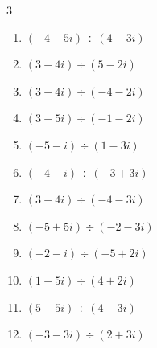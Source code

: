 \begin{multicols}{3}
\begin{enumerate}
  \item $\displaystyle (-4-5i)\div(4-3i)$


  \item $\displaystyle (3-4i)\div(5-2i)$


  \item $\displaystyle (3+4i)\div(-4-2i)$


  \item $\displaystyle (3-5i)\div(-1-2i)$


  \item $\displaystyle (-5-i)\div(1-3i)$


  \item $\displaystyle (-4-i)\div(-3+3i)$


\columnbreak %

\resetques

  \item $\displaystyle (3-4i)\div(-4-3i)$

        \phantom{$\displaystyle =i$}

  \item $\displaystyle (-5+5i)\div(-2-3i)$


  \item $\displaystyle (-2-i)\div(-5+2i)$


  \item $\displaystyle (1+5i)\div(4+2i)$


  \item $\displaystyle (5-5i)\div(4-3i)$


  \item $\displaystyle (-3-3i)\div(2+3i)$


\end{enumerate}
\end{multicols}
